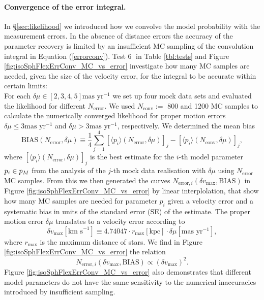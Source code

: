 \paragraph{Convergence of the error integral.} In \S \ref{sec:likelihood} we introduced how we convolve the model probability with the measurement errors. In the absence of distance errors the accuracy of the parameter recovery is limited by an insufficient MC sampling of the convolution integral in Equation (\ref{errorconv}). Test \textcircled{6} in Table \ref{tbl:tests} and Figure \ref{fig:isoSphFlexErrConv_MC_vs_error} investigate how many MC samples are needed, given the size of the velocity error, for the integral to be accurate within certain limits:
\\For each $\delta \mu \in [2,3,4,5] \text{mas yr}^{-1}$ we set up four mock data sets and evaluated the likelihood for different $N_\text{error}$. We used $N_\text{conv} :=$ 800 and 1200 MC samples to calculate the numerically converged likelihood for proper motion errors $\delta \mu \leq 3 \text{mas yr}^{-1}$ and $\delta \mu > 3 \text{mas yr}^{-1}$, respectively. We determined the mean bias 
\begin{equation*}
\text{BIAS}(N_\text{error},\delta \mu) \equiv \frac{1}{4} \sum_{j=1}^4 \left[ \langle p_i \rangle (N_\text{error},\delta \mu)\right]_j - \left[ \langle p_i \rangle (N_\text{conv},\delta \mu)\right]_j,
\end{equation*}
where $\left[ \langle p_i \rangle (N_\text{error},\delta \mu)\right]_j$ is the best estimate for the $i$-th model parameter $p_i \in p_M$ from the analysis of the $j$-th mock data realisation with $\delta \mu$ using $N_\text{error}$ MC samples. From this we then generated the curves $N_{\text{error},i} (\delta v_\text{max},\text{BIAS})$ in Figure \ref{fig:isoSphFlexErrConv_MC_vs_error} by linear interplolation, that show how many MC samples are needed for parameter $p_i$ given a velocity error and a systematic bias in units of the standard error (SE) of the estimate. The proper motion error $\delta \mu$ translates to a velocity error according to 
\begin{equation}
\delta v_\text{max} [\text{km s}^{-1}] \equiv 4.74047 \cdot r_\text{max}[\text{kpc}] \cdot \delta \mu [\text{mas yr}^{-1}], \label{eq:vmax}
\end{equation}
where $r_\text{max}$ is the maximum distance of stars. We find in Figure \ref{fig:isoSphFlexErrConv_MC_vs_error} the relation
\begin{equation*}
N_{\text{error},i} (\delta v_\text{max},\text{BIAS}) \propto \left( \delta v_\text{max} \right)^2.
\end{equation*}
Figure \ref{fig:isoSphFlexErrConv_MC_vs_error} also demonstrates that different model parameters do not have the same sensitivity to the numerical inaccuracies introduced by insufficient sampling. 



